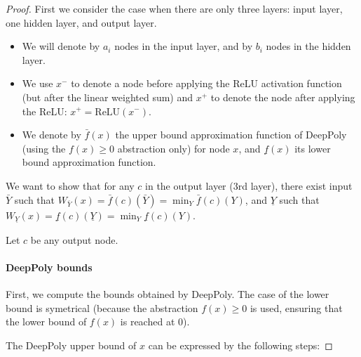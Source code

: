 \documentclass[]{article}
\theoremstyle{definition}
\newcommand{\ReLU}{\mathrm{ReLU}}
\begin{document}
\begin{proof}

	First we consider the case when there are only three layers: input layer, one hidden layer, and output layer. 





\begin{itemize}
    \item We will denote by $a_i$ nodes in the input layer, and by $b_i$ nodes in the hidden layer.

	\item We use $x^-$ to denote a node before applying the ReLU activation function (but after the linear weighted sum) and $x^+$ to denote the node after applying the ReLU: $x^+ = \ReLU(x^-)$.
	
	\item We denote by $\bar{f}(x)$ the upper bound approximation function of DeepPoly (using the $f(x) \geq 0$ abstraction only) for node $x$, 
	and $\underline{f}(x)$ its lower bound approximation function.
\end{itemize}

We want to show that for any $c$ in the output layer (3rd layer), there exist 
input $\bar{Y}$ such that $W_{\bar{Y}}(x) = \bar{f}(c)(\bar{Y}) = \min_Y \bar{f}(c)(Y)$, and 
 $\underline{Y}$ such that $W_{\underline{Y}}(x) = \underline{f}(c)(\underline{Y}) = \min_Y \underline{f}(c)(Y)$.

Let $c$ be any output node.


\paragraph{DeepPoly bounds} 

First, we compute the bounds obtained by DeepPoly.
The case of the lower bound is symetrical (because the abstraction $f(x)\geq 0$ is used, ensuring that the lower bound of $f(x)$ is reached at 0). 

The DeepPoly upper bound of $x$ can be expressed by the following steps: 


\end{proof}
\end{document}
